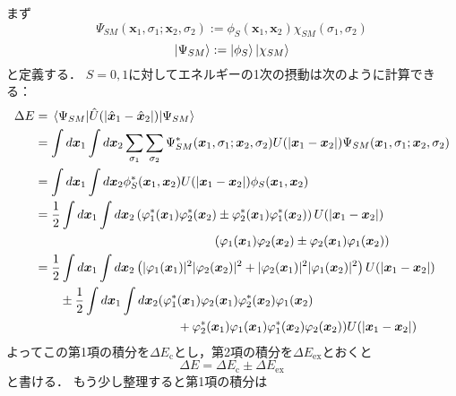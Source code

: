 \documentclass[a4paper,11pt]{jsarticle}
\begin{document}
まず
\begin{equation}
  \Psi_{SM}(\bm{x}_1,\sigma_1; \bm{x}_2,\sigma_2) := \phi_{S}(\bm{x}_1, \bm{x}_2) \chi_{SM} (\sigma_1, \sigma_2)  
\end{equation}
\begin{equation}
  \ket{\Psi_{SM}} := \ket{\phi_S} \ket{\chi_{SM}}
\end{equation}
と定義する．
$S=0,1$に対してエネルギーの1次の摂動は次のように計算できる：
\begin{align}
  \Delta E 
  &= \expval{\hat{U}(\lvert \hat{\bm{x}}_1 - \hat{\bm{x}}_2\rvert)}{\Psi_{SM}} \notag\\
  &= \int d\bm{x}_1 \int d\bm{x}_2 \sum_{\sigma_1} \sum_{\sigma_2} \Psi^*_{SM}(\bm{x}_1, \sigma_1; \bm{x}_2,\sigma_2) U(\lvert \bm{x}_1 - \bm{x}_2 \rvert) \Psi_{SM}(\bm{x}_1, \sigma_1; \bm{x}_2,\sigma_2) \notag\\
  &= \int d\bm{x}_1 \int d\bm{x}_2 \phi^*_S(\bm{x}_1, \bm{x}_2) U(\lvert \bm{x}_1 - \bm{x}_2 \rvert) \phi_S(\bm{x}_1, \bm{x}_2) \notag\\
  &= \frac{1}{2}\int d\bm{x}_1 \int d\bm{x}_2 \left( \varphi^*_1(\bm{x}_1)\varphi^*_2(\bm{x}_2) \pm \varphi^*_2(\bm{x}_1)\varphi^*_1(\bm{x}_2)\right) U(\lvert\bm{x}_1 - \bm{x}_2\rvert) \notag\\
  &\hspace{5cm} \left( \varphi_1(\bm{x}_1)\varphi_2(\bm{x}_2) \pm \varphi_2(\bm{x}_1)\varphi_1(\bm{x}_2) \right) \notag\\
  &= \frac{1}{2} \int d\bm{x}_1 \int d\bm{x}_2 \left(\lvert \varphi_1(\bm{x}_1) \rvert^2 \lvert \varphi_2(\bm{x}_2) \rvert^2 + \lvert \varphi_2(\bm{x}_1) \rvert^2 \lvert \varphi_1(\bm{x}_2) \rvert^2 \right) U(\lvert\bm{x}_1 - \bm{x}_2\rvert) \notag\\
  &\qquad\pm \frac{1}{2} \int d\bm{x}_1 \int d\bm{x}_2 ( \varphi^*_1(\bm{x}_1)\varphi_2(\bm{x}_1)\varphi^*_2(\bm{x}_2)\varphi_1(\bm{x}_2) \notag\\
  &\hspace{4cm} + \varphi^*_2(\bm{x}_1)\varphi_1(\bm{x}_1)\varphi^*_1(\bm{x}_2)\varphi_2(\bm{x}_2)  ) U(\lvert\bm{x}_1 - \bm{x}_2\rvert)
  \label{dE}
\end{align}
よってこの第1項の積分を$\Delta E_{\mathrm{c}}$とし，第2項の積分を$\Delta E_{\mathrm{ex}}$とおくと
\begin{equation}
  \Delta E = \Delta E_{\mathrm{c}} \pm \Delta E_{\mathrm{ex}}
\end{equation}
と書ける．
もう少し整理すると第1項の積分は
\end{document}
